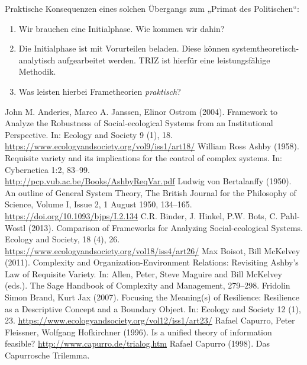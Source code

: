 \documentclass[11pt,a4paper]{article}
\begin{document}
Praktische Konsequenzen eines solchen Übergangs zum „Primat des Politischen“:
\begin{enumerate}[noitemsep]
\item Wir brauchen eine Initialphase. Wie kommen wir dahin?
\item Die Initialphase ist mit Vorurteilen beladen. Diese können
  systemtheoretisch-analytisch aufgearbeitet werden.  TRIZ ist hierfür eine
  leistungsfähige Methodik.
\item Was leisten hierbei Frametheorien \emph{praktisch}?
\end{enumerate}

\begin{thebibliography}{xxx}
 John M. Anderies, Marco A. Janssen, Elinor Ostrom
  (2004).  Framework to Analyze the Robustness of Social-ecological Systems
  from an Institutional Perspective. In: Ecology and Society 9 (1),
  18.\\ \url{https://www.ecologyandsociety.org/vol9/iss1/art18/}
 William Ross Ashby (1958).  Requisite variety and its
  implications for the control of complex systems. In: Cybernetica 1:2,
  83--99.\\ \url{http://pcp.vub.ac.be/Books/AshbyReqVar.pdf}
 Ludwig von Bertalanffy (1950). An outline of General
  System Theory, The British Journal for the Philosophy of Science, Volume I,
  Issue 2, 1 August 1950, 134–165.\\
  \url{https://doi.org/10.1093/bjps/I.2.134}
 C.R. Binder, J. Hinkel, P.W. Bots, C. Pahl-Wostl (2013).
  Comparison of Frameworks for Analyzing Social-ecological Systems. Ecology
  and Society, 18 (4), 26.  \\
  \url{https://www.ecologyandsociety.org/vol18/iss4/art26/}
 Max Boisot, Bill McKelvey (2011). Complexity and
  Organization-Environment Relations: Revisiting Ashby’s Law of Requisite
  Variety. In: Allen, Peter, Steve Maguire and Bill McKelvey (eds.). The Sage
  Handbook of Complexity and Management, 279--298. 
 Fridolin Simon Brand, Kurt Jax (2007).  Focusing the
  Meaning(s) of Resilience: Resilience as a Descriptive Concept and a Boundary
  Object. In: Ecology and Society 12 (1), 23.
  \url{https://www.ecologyandsociety.org/vol12/iss1/art23/}
 Rafael Capurro, Peter Fleissner, Wolfgang Hofkirchner
  (1996). Is a unified theory of information feasible?
  \url{http://www.capurro.de/trialog.htm}
 Rafael Capurro (1998). Das Capurrosche Trilemma.

\end{thebibliography}
\end{document}
